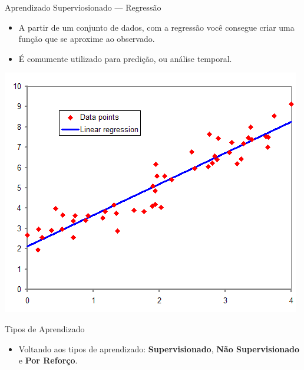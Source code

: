 \documentclass{libs/ufc_format}
\begin{document}
\begin{frame}{Aprendizado Superviosionado  --- Regressão}
    \begin{itemize}
        \justifying
        \item A partir de um conjunto de dados, com a regressão você consegue criar uma função que se aproxime ao observado.
        \item É comumente utilizado para predição, ou análise temporal.
    \end{itemize}
    \centering
    \includegraphics[scale = 0.45]{media/normdist_regression}
\end{frame}

\begin{frame}{Tipos de Aprendizado}
    \begin{itemize}
        \justifying
        \item Voltando aos tipos de aprendizado: \textbf{Supervisionado}, \alert{\textbf{Não Supervisionado}} e \textbf{Por Reforço}.
    \end{itemize}
\end{frame}
\end{document}
